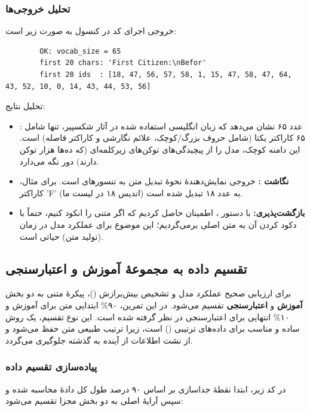\documentclass{article}
\begin{document}
\subsubsection*{تحلیل خروجی‌ها}
خروجی اجرای کد در کنسول به صورت زیر است:
\begin{latin}
	\begin{verbatim}
		OK: vocab_size = 65
		first 20 chars: 'First Citizen:\nBefor'
		first 20 ids  : [18, 47, 56, 57, 58, 1, 15, 47, 58, 47, 64, 43, 52, 10, 0, 14, 43, 44, 53, 56]
	\end{verbatim}
\end{latin}

تحلیل نتایج:
\begin{itemize}
	\item {}: عدد ۶۵ نشان می‌دهد که زبان انگلیسی استفاده شده در آثار شکسپیر، تنها شامل ۶۵ کاراکتر یکتا (شامل حروف بزرگ/کوچک، علائم نگارشی و کاراکتر فاصله) است. این دامنه کوچک، مدل را از پیچیدگی‌های توکن‌های زیرکلمه‌ای (که ده‌ها هزار توکن دارند) دور نگه می‌دارد.
	\item \textbf{نگاشت :} خروجی  نمایش‌دهندۀ نحوۀ تبدیل متن به تنسورهای  است. برای مثال، کاراکتر 'F' (اندیس ۱۸ در لیست ما) به عدد ۱۸ تبدیل شده است.
	\item \textbf{بازگشت‌پذیری:} با دستور ، اطمینان حاصل کردیم که اگر متنی را انکود کنیم، حتماً با دکود کردن آن به متن اصلی برمی‌گردیم؛ این موضوع برای عملکرد مدل در زمان  (تولید متن) حیاتی است.
\end{itemize}

\subsection{تقسیم داده به مجموعۀ آموزش و اعتبارسنجی}

برای ارزیابی صحیح عملکرد مدل و تشخیص بیش‌برازش ()، پیکرۀ متنی به دو بخش \textbf{آموزش} و \textbf{اعتبارسنجی} تقسیم می‌شود. در این تمرین، ۹۰\% ابتدایی متن برای آموزش و ۱۰\% انتهایی برای اعتبارسنجی در نظر گرفته شده است. این نوع تقسیم، یک روش ساده و مناسب برای داده‌های ترتیبی () است، زیرا ترتیب طبیعی متن حفظ می‌شود و از نشت اطلاعات از آینده به گذشته جلوگیری می‌گردد.

\subsubsection*{پیاده‌سازی تقسیم داده}
در کد زیر، ابتدا نقطۀ جداسازی بر اساس ۹۰ درصد طول کل دادۀ محاسبه شده و سپس آرایۀ اصلی به دو بخش مجزا تقسیم می‌شود:
\end{document}

